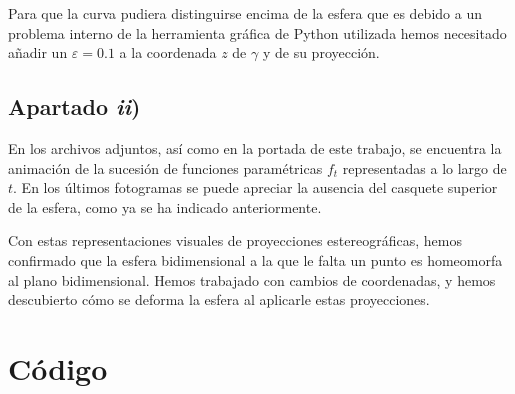 \documentclass[a4paper]{article}
\begin{document}
	Para que la curva pudiera distinguirse encima de la esfera \textemdash que es debido a un problema interno de la herramienta gráfica de Python utilizada \textemdash hemos necesitado añadir un $\varepsilon=0.1$ a la coordenada $z$ de $\gamma$ y de su proyección.
	
	\subsection{Apartado \textit{ii})}
	En los archivos adjuntos, así como en la portada de este trabajo, se encuentra la animación de la sucesión de funciones paramétricas $f_t$ representadas a lo largo de $t$. En los últimos fotogramas se puede apreciar la ausencia del casquete superior de la esfera, como ya se ha indicado anteriormente.
	
	Con estas representaciones visuales de proyecciones estereográficas, hemos confirmado que la esfera bidimensional a la que le falta un punto es homeomorfa al plano bidimensional. Hemos trabajado con cambios de coordenadas, y hemos descubierto cómo se deforma la esfera al aplicarle estas proyecciones.
	
	\newpage
	\section{Código}\label{codigo}
	
	
	
\end{document}
